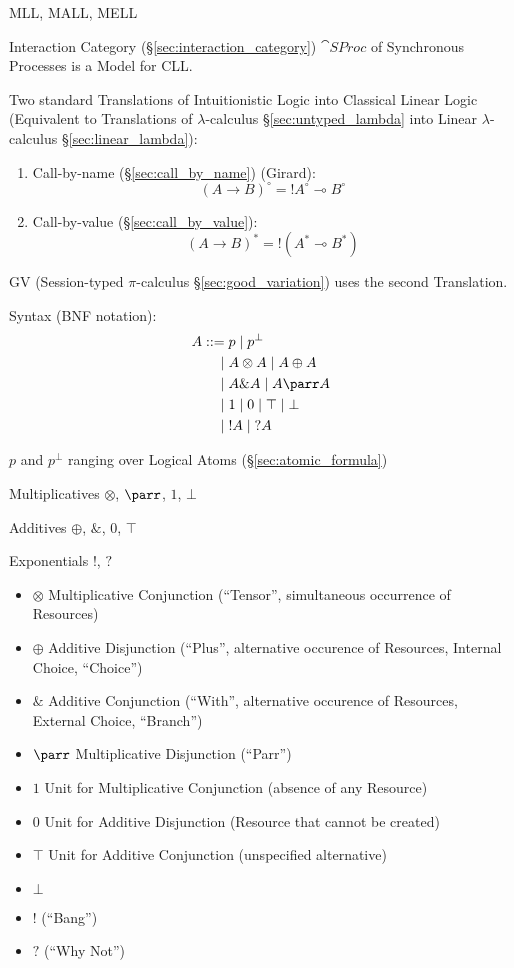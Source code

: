 MLL, MALL, MELL

Interaction Category (\S\ref{sec:interaction_category}) $\cat{SProc}$
of Synchronous Processes is a Model for CLL.

Two standard Translations of Intuitionistic Logic into Classical
Linear Logic (Equivalent to Translations of $\lambda$-calculus
\S\ref{sec:untyped_lambda} into Linear
$\lambda$-calculus \S\ref{sec:linear_lambda}):\cite{wadler12}
\begin{enumerate}
  \item Call-by-name (\S\ref{sec:call_by_name}) (Girard):
\[
  (A \rightarrow B)^\circ = !A^\circ \multimap B^\circ
\]
  \item Call-by-value (\S\ref{sec:call_by_value}):
\[
  (A \rightarrow B)^* = !(A^* \multimap B^*)
\]
\end{enumerate}
GV (Session-typed $\pi$-calculus \S\ref{sec:good_variation}) uses the
second Translation.

Syntax (BNF notation):
\[
\begin{split}
  A ::=& \; p \; | \; p^\bot\\
      |& \; A \otimes A \; | \; A \oplus A\\
      |& \; A \& A \; | \; A \parr A\\
      |& \; 1 \; | \; 0 \; | \; \top \; | \; \bot\\
      |& \; !A \; | \; ?A
\end{split}
\]

$p$ and $p^\bot$ ranging over Logical Atoms
(\S\ref{sec:atomic_formula})

Multiplicatives $\otimes$, $\parr$, $1$, $\bot$

Additives $\oplus$, $\&$, $0$, $\top$

Exponentials $!$, $?$

\begin{itemize}
  \item $\otimes$ Multiplicative Conjunction (``Tensor'', simultaneous
    occurrence of Resources)
  \item $\oplus$ Additive Disjunction (``Plus'', alternative occurence
    of Resources, Internal Choice, ``Choice'')
  \item $\&$ Additive Conjunction (``With'', alternative occurence of
    Resources, External Choice, ``Branch'')
  \item $\parr$ Multiplicative Disjunction (``Parr'')
  \item $1$ Unit for Multiplicative Conjunction (absence of any
    Resource)
  \item $0$ Unit for Additive Disjunction (Resource that cannot be
    created)
  \item $\top$ Unit for Additive Conjunction (unspecified alternative)
  \item $\bot$
  \item $!$ (``Bang'')
  \item $?$ (``Why Not'')
\end{itemize}

